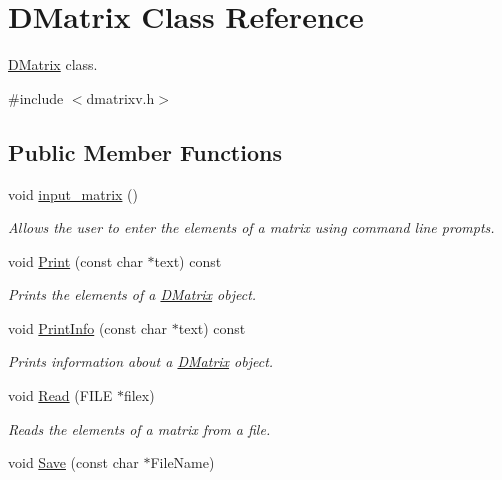 \hypertarget{classDMatrix}{
\section{DMatrix Class Reference}
\label{classDMatrix}
}


\hyperlink{classDMatrix}{DMatrix} class.  




{\ttfamily \#include $<$dmatrixv.h$>$}

\subsection*{Public Member Functions}
\begin{DoxyCompactItemize}
\item 
void \hyperlink{classDMatrix_a414e84e3c2c91900f44b58a9d09d0acc}{input\_\-matrix} ()
\begin{DoxyCompactList}\small\item\em Allows the user to enter the elements of a matrix using command line prompts. \item\end{DoxyCompactList}\item 
void \hyperlink{classDMatrix_a998b1e7e9dd6c837971f264660075efe}{Print} (const char $\ast$text) const 
\begin{DoxyCompactList}\small\item\em Prints the elements of a \hyperlink{classDMatrix}{DMatrix} object. \item\end{DoxyCompactList}\item 
void \hyperlink{classDMatrix_a6e471ebaba82f41591b69fdfc8d72eaa}{PrintInfo} (const char $\ast$text) const 
\begin{DoxyCompactList}\small\item\em Prints information about a \hyperlink{classDMatrix}{DMatrix} object. \item\end{DoxyCompactList}\item 
void \hyperlink{classDMatrix_a12b3c21b0467172f8a6ae976f04a9e99}{Read} (FILE $\ast$filex)
\begin{DoxyCompactList}\small\item\em Reads the elements of a matrix from a file. \item\end{DoxyCompactList}\item 
void \hyperlink{classDMatrix_a67346b3c1a7e04b0e071e59e06b5399a}{Save} (const char $\ast$FileName)

\end{DoxyCompactItemize}
